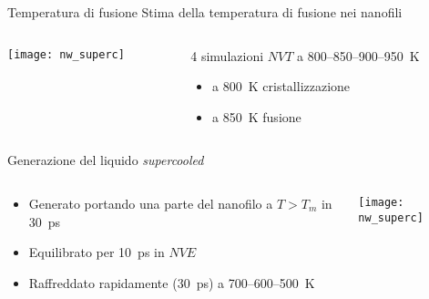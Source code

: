 \documentclass{beamer}
\begin{document}
\begin{frame}{Temperatura di fusione}
\centering
Stima della temperatura di fusione nei nanofili\\[12pt]
\begin{columns}
\begin{column}{0.4\textwidth}
\texttt{[image: nw\_superc]}
\end{column}
%
\begin{column}{0.6\textwidth}
 4 simulazioni $NVT$ a \num{800}--\num{850}--\num{900}--\SI{950}{K}%
  \begin{itemize}
    \item a \SI{800}{K} {\ev cristallizzazione}
    \item a \SI{850}{K} {\ev fusione}
  \end{itemize}
\end{column}
\end{columns}

\end{frame}




\begin{frame}{Generazione del liquido \emph{supercooled}}
 \begin{columns}
  \begin{column}{0.5\textwidth}
   \begin{itemize}
    \item Generato portando una parte del nanofilo a $T > T_m$ in \SI{30}{ps}
    \item Equilibrato per \SI{10}{ps} in $NVE$
    \item Raffreddato rapidamente (\SI{30}{ps}) a \num{700}--\num{600}--\SI{500}{K}
   \end{itemize}

  \end{column}
  \begin{column}{0.5\textwidth}
   \texttt{[image: nw\_superc]}
  \end{column}
 \end{columns}
\end{frame}
\end{document}

